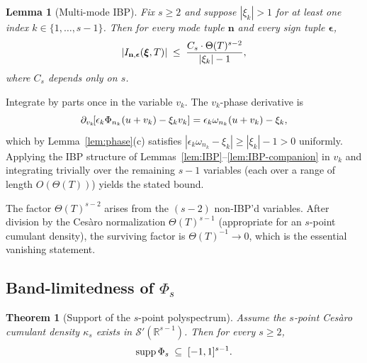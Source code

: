 \documentclass{amsart}
\newcommand{\tmmathbf}[1]{\ensuremath{\boldsymbol{#1}}}
\newcommand{\tmop}[1]{\ensuremath{\operatorname{#1}}}
\newtheorem{lemma}{Lemma}
\newtheorem{theorem}{Theorem}
\newcommand{\supp}{\tmop{supp}}
\newcommand{\abs}[1]{\left| #1 \right|}
\begin{document}
\begin{lemma}
  [Multi-mode IBP]\label{lem:multi-IBP} Fix $s \ge 2$ and suppose $\abs{\xi_k}
  > 1$ for at least one index $k \in \{1, \ldots, s - 1\}$. Then for every
  mode tuple $\mathbf{n}$ and every sign tuple $\tmmathbf{\epsilon}$,
  \[ \abs{I_{\mathbf{n}, \tmmathbf{\epsilon}} (\tmmathbf{\xi}, T)}
     \hspace{0.27em} \le \hspace{0.27em} \frac{C_s \cdot \Theta (T)^{s -
     2}}{\abs{\xi_k} - 1}, \]
  where $C_s$ depends only on $s$.
\end{lemma}

Integrate by parts once in the variable $v_k$. The $v_k$-phase derivative is
\[ \partial_{v_k}  \hspace{-0.17em} [\epsilon_k \Phi_{n_k} (u + v_k) - \xi_k
   v_k] = \epsilon_k \omega_{n_k}  (u + v_k) - \xi_k, \]
which by Lemma~\ref{lem:phase}(c) satisfies $\abs{\epsilon_k \omega_{n_k} -
\xi_k} \ge \abs{\xi_k} - 1 > 0$ uniformly. Applying the IBP structure of
Lemmas~\ref{lem:IBP}--\ref{lem:IBP-companion} in $v_k$ and integrating
trivially over the remaining $s - 1$ variables (each over a range of length $O
(\Theta (T))$) yields the stated bound.

\begin{remark}
  The factor $\Theta (T)^{s - 2}$ arises from the $(s - 2)$ non-IBP'd
  variables. After division by the Ces{\`a}ro normalization $\Theta (T)^{s -
  1}$ (appropriate for an $s$-point cumulant density), the surviving factor is
  $\Theta (T)^{- 1} \to 0$, which is the essential vanishing statement.
\end{remark}

\subsection{Band-limitedness of $\Phi_s$}

\begin{theorem}
  [Support of the $s$-point polyspectrum]\label{thm:poly} Assume the $s$-point
  Ces{\`a}ro cumulant density $\kappa_s$ exists in $\mathcal{S}'
  (\mathbb{R}^{s - 1})$. Then for every $s \ge 2$,
  \[ \supp \Phi_s \hspace{0.27em} \subseteq \hspace{0.27em} [- 1, 1]^{s - 1} .
  \]
\end{theorem}
\end{document}
